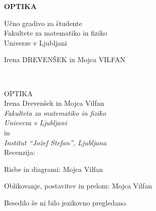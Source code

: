 \documentclass[11pt,fleqn]{book} %
\begin{document}
                
\let\cleardoublepage\clearpage
\makeatletter
\setlength{\@fptop}{0pt}
\makeatother




\begingroup
\thispagestyle{empty}
\centering
\vspace*{5cm}
\par\normalfont\fontsize{35}{35}\sffamily\selectfont
\textbf{OPTIKA}
{\LARGE }\par %
\vspace*{1cm}
{\LARGE Učno gradivo za študente \\
Fakultete za matematiko in fiziko \\
Univerze v Ljubljani}\par %
\vspace*{1cm}
\vspace*{8cm}
{\Large Irena DREVENŠEK in Mojca VILFAN}\par %
\endgroup


\newpage
~\vfill
\thispagestyle{empty}

OPTIKA \\

Irena Drevenšek in Mojca Vilfan \\

{\it Fakulteta za matematiko in fiziko\\
Univerza v Ljubljani}\\
in\\
{\it Institut ``Jožef Stefan'', Ljubljana}\\
 
 Recenzija:  \linebreak[1]%

 Risbe in diagrami: Mojca Vilfan\linebreak[1] %
 
 Oblikovanje, postavitev in prelom: Mojca Vilfan \linebreak[1] %

 Besedilo še ni bilo jezikovno pregledano.\linebreak[1]
 
\end{document}
